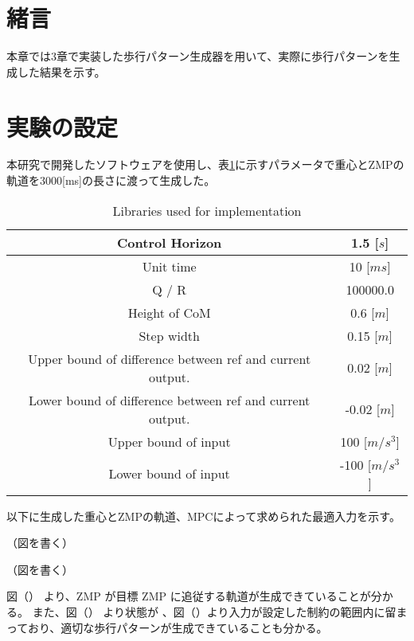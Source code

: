\section{緒言}
本章では3章で実装した歩行パターン生成器を用いて、実際に歩行パターンを生成した結果を示す。
\section{実験の設定}
本研究で開発したソフトウェアを使用し、表\ref{tb:parametor}に示すパラメータで重心とZMPの軌道を3000[ms]の長さに渡って生成した。

\begin{table}[htbp]
  \centering
  \begin{tabular}{|c|c|} \hline
    Control Horizon & 1.5 [$s$] \\ \hline
    Unit time &10 [$ms$] \\ \hline
    Q / R  & 100000.0 \\ \hline
    Height of CoM & 0.6 [$m$] \\ \hline
    Step width & 0.15 [$m$] \\ \hline
    Upper bound of difference between ref and current output. & 0.02 [$m$] \\ \hline
    Lower bound of difference between ref and current output. & -0.02 [$m$] \\ \hline
    Upper bound of input & 100 [$m/s^{3}$] \\ \hline
    Lower bound of input & -100 [$m/s^{3}$] \\ \hline
  \end{tabular}
  \caption{Libraries used for implementation}
  \label{tb:parametor}
\end{table}

以下に生成した重心とZMPの軌道、MPCによって求められた最適入力を示す。

（図を書く）

（図を書く）

図（） より、ZMP が目標 ZMP に追従する軌道が生成できていることが分かる。 また、図（） より状態が 、図（）より入力が設定した制約の範囲内に留まっており、適切な歩行パターンが生成できていることも分かる。


